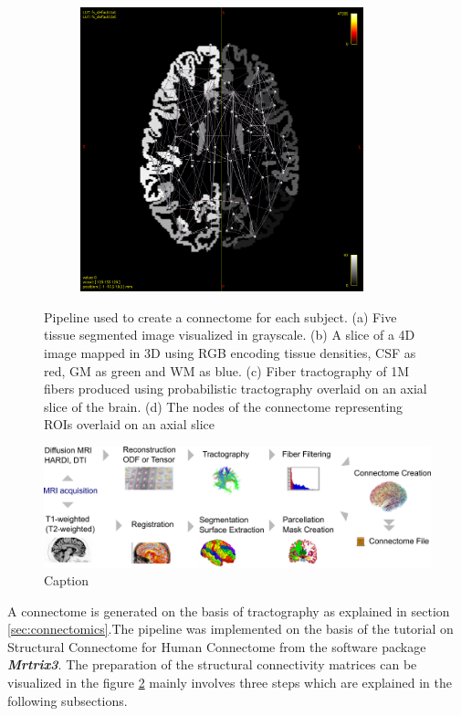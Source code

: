 \documentclass[msthesis.tex]{subfiles}
\begin{document}
\begin{figure}
\begin{subfigure}[b]{0.4\textwidth}
         \includegraphics[height=0.9\textwidth,width=0.9\textwidth]{images/connectome.png}
         \caption{}
         \label{fig:1M_tract}
     \end{subfigure}
     \fi
 
    \caption{Pipeline used to create a connectome for each subject. (a) Five tissue segmented image visualized in grayscale. (b) A slice of a 4D image mapped in 3D using RGB encoding tissue densities, CSF as red, GM as green and WM as blue. (c) Fiber tractography of 1M fibers produced using probabilistic tractography overlaid on an axial slice of the brain. (d) The nodes of the connectome representing ROIs overlaid on an axial slice}
    \label{fig:preproc}
\end{figure}

\begin{figure}
    \centering
    \includegraphics[width=\textwidth]{images/connectome_creation_workflow.png}
    \caption{Caption}
    \label{fig:my_label}
\end{figure}
A connectome is generated on the basis of tractography as explained in section \ref{sec:connectomics}.The pipeline was implemented on the basis of the tutorial on Structural Connectome for Human Connectome from the software package \textbf{\textit{Mrtrix3}}. The preparation of the structural connectivity matrices can be visualized in the figure \ref{fig:preproc} mainly involves three steps which are explained in the following subsections.
\end{document}
